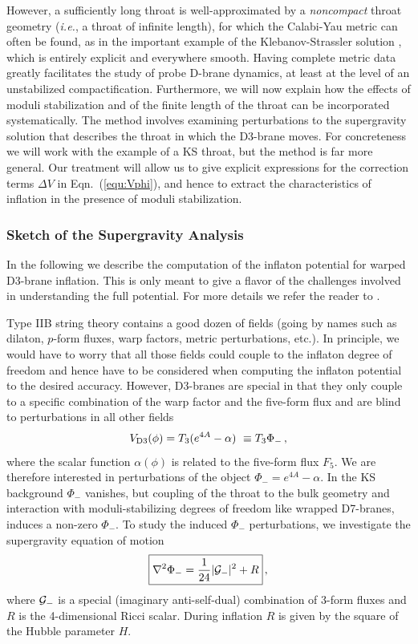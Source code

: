 \documentclass[12pt,letterpaper,rotate]{article}
\def\beq{\begin{equation}}
\def\eeq{\end{equation}}
\begin{document}
{However, a sufficiently long throat is well-approximated by a {\it noncompact} throat geometry ({\it i.e.}, a throat of infinite length), for which the Calabi-Yau metric can often be found,
as in the important example of the Klebanov-Strassler solution \cite{KS}, which is entirely explicit and everywhere smooth.  Having complete metric data greatly facilitates the study of probe D-brane dynamics, at least at the level of an unstabilized compactification.
Furthermore, we will now explain how the effects of moduli stabilization and of the finite length of the throat can be incorporated systematically.  The method involves examining perturbations to the supergravity solution that
describes
the throat in which the D3-brane moves.  For concreteness we will work with the example of a KS throat, but the method is far more general.
Our treatment will allow us to
give explicit expressions for the correction terms $\Delta V$ in Eqn.~(\ref{equ:Vphi}), and hence to extract the characteristics of inflation in the presence of moduli stabilization.

\subsubsection{Sketch of the Supergravity Analysis}

In the following we describe the computation of the inflaton potential for warped D3-brane inflation.
This is only meant to give a flavor of the challenges involved in understanding the full potential. For more details we refer the reader to \cite{KKLMMT, Baumann:2006th, Baumann:2007ah, Baumann:2008kq, Baumann:2007np}.

Type IIB string theory contains a good dozen of fields (going by names such as dilaton, $p$-form fluxes, warp factors, metric perturbations, etc.). In principle, we would have to worry that all those fields could couple to the inflaton degree of freedom and hence have to be considered when computing the inflaton potential to the desired accuracy.
However, D3-branes are special in that they only couple to a specific combination of the warp factor and the five-form flux and are blind to perturbations in all other fields
\beq
V_{\rm D3}(\phi) = T_3 (e^{4A} - \alpha)\ \equiv T_3 \Phi_-\, ,
\eeq
where the scalar function $\alpha(\phi)$ is related to the five-form flux $F_5$.
We are therefore interested in perturbations of the object $\Phi_- =  e^{4A}-\alpha$.
In the KS background $\Phi_- $ vanishes, but coupling of the throat to the bulk geometry and interaction with moduli-stabilizing degrees of freedom like wrapped D7-branes, induces a non-zero $\Phi_-$. To study the induced $\Phi_-$ perturbations, we 
investigate the supergravity equation of motion
\beq
\label{equ:Phim}
\fbox{$\displaystyle
\nabla^2 \Phi_- = \frac{1}{24} |{\cal G}_-|^2 + R $}\, ,
\eeq
where ${\cal G}_-$ is a special (imaginary anti-self-dual) combination of 3-form fluxes and $R$ is the 4-dimensional Ricci scalar.
During inflation $R$ is given by the square of the Hubble parameter $H$.

}
\end{document}
